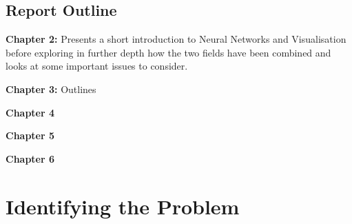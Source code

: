\documentclass[a4paper,11pt,titlepage]{article}
\begin{document}
	\subsection{Report Outline}
	\textbf{Chapter 2:} Presents a short introduction to Neural Networks and Visualisation before exploring in further depth how the two fields have been combined and looks at some important issues to consider.
	\par
	\textbf{Chapter 3:} Outlines 
	\par
	\textbf{Chapter 4} 
	\par
	\textbf{Chapter 5} 
	\par
	\textbf{Chapter 6} 
	\par	
	
\clearpage

\section{Identifying the Problem}
\end{document}
